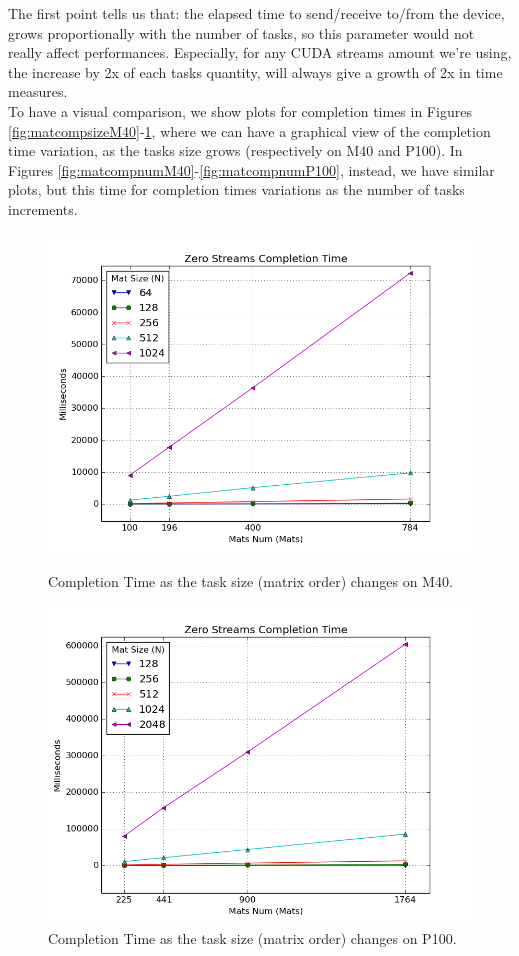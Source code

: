 The first point tells us that: the elapsed time to send/receive to/from the device, grows proportionally with the number of tasks, so this parameter would not really affect performances. Especially, for any CUDA streams amount we're using, the increase by 2x of each tasks quantity, will always give a growth of 2x in time measures.\\
To have a visual comparison, we show plots for completion times in Figures \ref{fig:matcompsizeM40}-\ref{fig:matcompsizeP100}, where we can have a graphical view of the completion time variation, as the tasks size grows (respectively on M40 and P100). In Figures \ref{fig:matcompnumM40}-\ref{fig:matcompnumP100}, instead, we have similar plots, but this time for completion times variations as the number of tasks increments.
\begin{figure}
	\centering
	\vspace{-2cm}
	\includegraphics[scale=0.7]{plots/mat_comp_sizevar.png}
	\caption{Completion Time as the task size (matrix order) changes on M40.}
	\label{fig:matcompsizeM40}
	\includegraphics[scale=0.7]{plots/mat_comp_sizevar_P100.png}
	\caption{Completion Time as the task size (matrix order) changes on P100.}
	\label{fig:matcompsizeP100}
\end{figure} 
